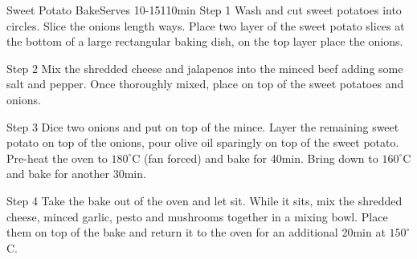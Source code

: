 \begin{recipe}{Sweet Potato Bake}{Serves 10-15}{110min}
Step 1 Wash and cut sweet potatoes into circles. Slice the onions length ways. Place two layer of the sweet potato slices at the bottom of a large rectangular baking dish, on the top layer place the onions.


Step 2 Mix the shredded cheese and jalapenos into the minced beef adding some salt and pepper. Once thoroughly mixed, place on top of the sweet potatoes and onions.

Step 3 Dice two onions and put on top of the mince. Layer the remaining sweet potato on top of the onions, pour olive oil sparingly on top of the sweet potato. Pre-heat the oven to $180^{\circ}$C (fan forced) and bake for 40min. Bring down to $160^{\circ}$C and bake for another 30min.


Step 4 Take the bake out of the oven and let sit. While it sits, mix the shredded cheese, minced garlic, pesto and mushrooms together in a mixing bowl. Place them on top of the bake and return it to the oven for an additional 20min at $150^{\circ}$C.


\end{recipe}